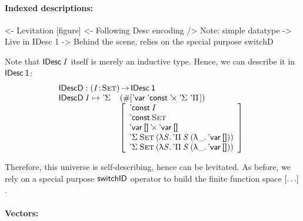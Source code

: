 \paragraph{Indexed descriptions:}

\begin{wstructure}
<- Levitation [figure]
    <- Following Desc encoding
        /> Note: simple datatype
            -> Live in IDesc 1
    -> Behind the scene, relies on the special purpose switchD
\end{wstructure}

Note that $\IDesc{\V{I}}$ itself is merely an inductive type. Hence,
we can describe it in $\IDesc{\Unit}$:
%
\[\stk{
\IDescD : \PI{\V{I}}{\Set} \IDesc{\Unit} \\
\begin{array}{@{}ll}
\IDescD\: \V{I} \mapsto \DSigma{\!}{\!} & (\EnumT \sqr{ 
                                          \DVar{\!}\:
                                          \DConst{\!}\:
                                          \DProd{\!}{\!}\:
                                          \DSigma{\!}{\!}\: 
                                          \DPi{\!}{\!}
                                             }) \\
                              & \bigRedBracket{\begin{array}{l}
                                      \DConst{\V{I}}                  \\
                                      \DConst{\Set}               \\
                                      \DProd{\DVar{\Void}}{\DVar{\Void}}  \\
                                      \DSigma{\Set}{(\LAM{\V{S}} \DPi{\V{S}}{(\LAM{\_} \DVar{\Void})})} \\
                                      \DSigma{\Set}{(\LAM{\V{S}} \DPi{\V{S}}{(\LAM{\_} \DVar{\Void})})}
                                   \end{array}
                             }
\end{array}
}\]

Therefore, this universe is self-describing, hence can be
levitated. As before, we rely on a special purpose $\F{switchID}$
operator to build the finite function space $\bigRedBracket{\ldots}$.

\paragraph{Vectors:}

